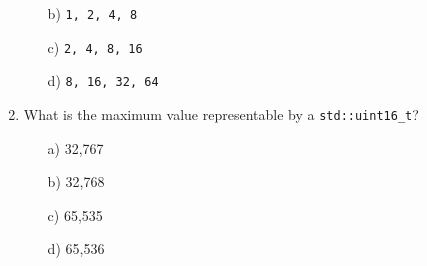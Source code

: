 \documentclass{article}
\begin{document}
\begin{enumerate}
\begin{itemize}
		\item[b)] {\texttt{1, 2, 4, 8}}
		\item[c)] \texttt{2, 4, 8, 16}
		\item[d)] \texttt{8, 16, 32, 64} 
	\end{itemize}
	\item What is the maximum value representable by a \texttt{std::uint16\_t}? \begin{itemize}
		\item[a)] 32,767
		\item[b)] 32,768
		\item[c)] {65,535}
		\item[d)] 65,536
	\end{itemize}
\end{enumerate}
\end{document}
